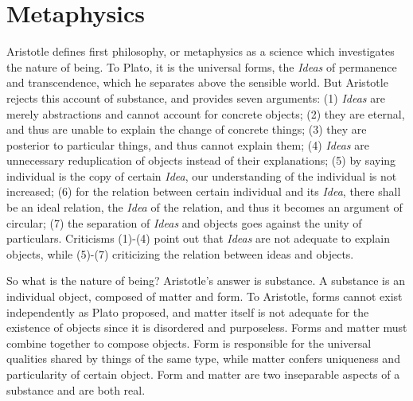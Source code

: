 \documentclass[11pt]{article}
\begin{document}
\section{Metaphysics}
Aristotle defines first philosophy, or metaphysics as a science which investigates the nature of being. 
To Plato, it is the universal forms, the \textit{Ideas} of permanence and transcendence, which he separates above the sensible world. 
But Aristotle rejects this account of substance, and provides seven arguments: 
(1) \textit{Ideas} are merely abstractions and cannot account for concrete objects; 
(2) they are eternal, and thus are unable to explain the change of concrete things; 
(3) they are posterior to particular things, and thus cannot explain them; 
(4) \textit{Ideas} are unnecessary reduplication of objects instead of their explanations; 
(5) by saying individual is the copy of certain \textit{Idea}, our understanding of the individual is not increased; 
(6) for the relation between certain individual and its \textit{Idea}, there shall be an ideal relation, the \textit{Idea} of the relation, and thus it becomes an argument of circular; 
(7) the separation of \textit{Ideas} and objects goes against the unity of particulars. 
Criticisms (1)-(4) point out that \textit{Ideas} are not adequate to explain objects, while (5)-(7) criticizing the relation between ideas and objects.

\newline

So what is the nature of being? 
Aristotle’s answer is substance. 
A substance is an individual object, composed of matter and form. 
To Aristotle, forms cannot exist independently as Plato proposed, and matter itself is not adequate for the existence of objects since it is disordered and purposeless. 
Forms and matter must combine together to compose objects. 
Form is responsible for the universal qualities shared by things of the same type, while matter confers uniqueness and particularity of certain object. 
Form and matter are two inseparable aspects of a substance and are both real.

\newline
\end{document}
